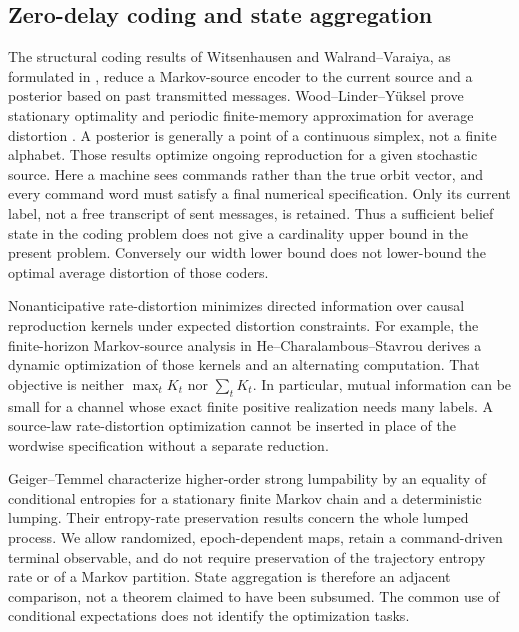 \subsection{Zero-delay coding and state aggregation}
The structural coding results of Witsenhausen and Walrand--Varaiya,
as formulated in \cite[Theorems 1--2]{WLY}, reduce a Markov-source encoder
to the current source and a posterior based on past transmitted messages.
Wood--Linder--Y\"uksel prove stationary optimality and periodic finite-memory
approximation for average distortion \cite[Theorems 3--4]{WLY}. A posterior
is generally a point of a continuous simplex, not a finite alphabet.
Those results optimize ongoing reproduction for a given stochastic
source. Here a machine sees commands rather than the true orbit vector,
and every command word must satisfy a final numerical specification.
Only its current label, not a free transcript of sent messages, is retained.
Thus a sufficient belief state in the coding problem does not give a
cardinality upper bound in the present problem. Conversely our width
lower bound does not lower-bound the optimal average distortion of those
coders.

Nonanticipative rate-distortion minimizes directed information over
causal reproduction kernels under expected distortion constraints.
For example, the finite-horizon Markov-source analysis in
He--Charalambous--Stavrou \cite[Sections II--III]{HCS} derives a dynamic
optimization of those kernels and an alternating computation. That
objective is neither $\max_t K_t$ nor $\sum_tK_t$. In particular,
mutual information can be small for a channel whose exact finite positive
realization needs many labels. A source-law rate-distortion optimization
cannot be inserted in place of the wordwise specification without a
separate reduction.

Geiger--Temmel \cite[Theorem 9]{GT} characterize higher-order strong
lumpability by an equality of conditional entropies for a stationary
finite Markov chain and a deterministic lumping. Their entropy-rate
preservation results concern the whole lumped process. We allow
randomized, epoch-dependent maps, retain a command-driven terminal
observable, and do not require preservation of the trajectory entropy
rate or of a Markov partition. State aggregation is therefore an adjacent
comparison, not a theorem claimed to have been subsumed. The common
use of conditional expectations does not identify the optimization tasks.

